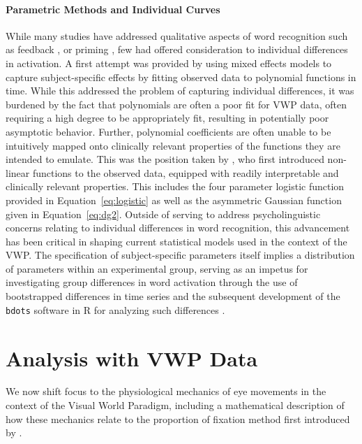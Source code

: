 \documentclass{article}
\newcommand{\xt}{\texttt}
\begin{document}
\paragraph{Parametric Methods and Individual Curves} While many studies have addressed qualitative aspects of word recognition such as feedback \citep{Magnuson2003}, or priming \citep{luce1998delayed}, few had offered consideration to individual differences in activation. A first attempt was provided by \citet{Mirman2008} using mixed effects models to capture subject-specific effects by fitting observed data to polynomial functions in time. While this addressed the problem of capturing individual differences, it was burdened by the fact that polynomials are often a poor fit for VWP data, often requiring a high degree to be appropriately fit, resulting in potentially poor asymptotic behavior. Further, polynomial coefficients are often unable to be intuitively mapped onto clinically relevant properties of the functions they are intended to emulate. This was the position taken by \citet{mcmurray2010individual}, who first introduced non-linear functions to the observed data, equipped with readily interpretable and clinically relevant properties. This includes the four parameter logistic function provided in Equation~\ref{eq:logistic} as well as the asymmetric Gaussian function given in Equation~\ref{eq:dg2}. Outside of serving to address psycholinguistic concerns relating to individual differences in word recognition, this advancement has been critical in shaping current statistical models used in the context of the VWP. The specification of subject-specific parameters itself implies a distribution of parameters within an experimental group, serving as an impetus for investigating group differences in word activation through the use of bootstrapped differences in time series \citep{oleson2017detecting} and the subsequent development of the \xt{bdots} software in R for analyzing such differences \citep{seedorff2018bdots}.



\section{Analysis with VWP Data}

We now shift focus to the physiological mechanics of eye movements in the context of the Visual World Paradigm, including a mathematical description of how these mechanics relate to the proportion of fixation method first introduced by \citet{allopenna1998tracking}.  
\end{document}
